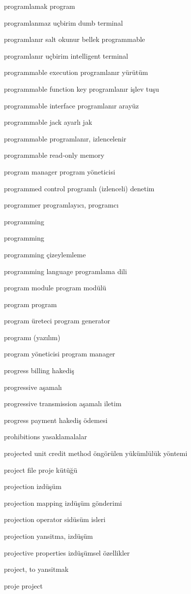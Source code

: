 \documentclass[12pt,fleqn]{article}\usepackage{../../common}
\begin{document}
programlamak program

programlanmaz uçbirim dumb terminal

programlanır salt okunur bellek programmable

programlanır uçbirim intelligent terminal

programmable execution programlanır yürütüm

programmable function key programlanır işlev tuşu

programmable interface programlanır arayüz

programmable jack ayarlı jak

programmable programlanır, izlencelenir

programmable read-only memory

program manager program yöneticisi

programmed control programlı (izlenceli) denetim

programmer programlayıcı, programcı

programming

programming

programming çizeylemleme

programming language programlama dili

program module program modülü

program program

program üreteci program generator

programı (yazılım)

program yöneticisi program manager

progress billing hakediş

progressive aşamalı

progressive transmission aşamalı iletim

progress payment hakediş ödemesi

prohibitions yasaklamalalar

projected unit credit method öngörülen yükümlülük yöntemi

project file proje kütüğü

projection izdüşüm

projection mapping izdüşüm gönderimi

projection operator sidüsüm isleri

projection yansitma, izdüşüm

projective properties izdüşümsel özellikler

project, to yansitmak

proje project
\end{document}
